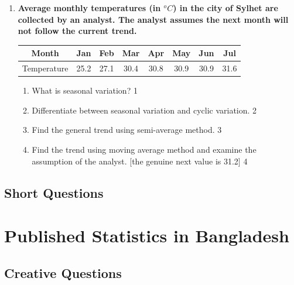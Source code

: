 \documentclass[a4paper,oneside]{book}
\begin{document}
\begin{enumerate}
 \item
	  \textbf{Average monthly temperatures (in $^o C$) in the city of Sylhet are collected by an analyst. The analyst assumes the next month will not follow the current trend.} 
	  
	  \begin{table}[h]
	  \centering
\begin{tabular}{c|c|c|c|c|c|c|c}
Month & Jan & Feb & Mar & Apr & May & Jun & Jul \\ \hline
Temperature & 25.2 & 27.1 & 30.4 & 30.8 & 30.9 & 30.9 & 31.6
\end{tabular}
\end{table}
  
  \begin{enumerate}
    \item
	What is seasonal variation? \hfill 1
    \item
	Differentiate between seasonal variation and cyclic variation. \hfill 2
    \item  
	Find the general trend using semi-average method. \hfill 3
    \item
	Find the trend using moving average method and examine the assumption of the analyst. [the genuine next value is 31.2] \hfill 4
  \end{enumerate}

\end{enumerate}

\section{Short Questions}

\chapter{Published Statistics in Bangladesh} 
\section{Creative Questions}
\end{document}

